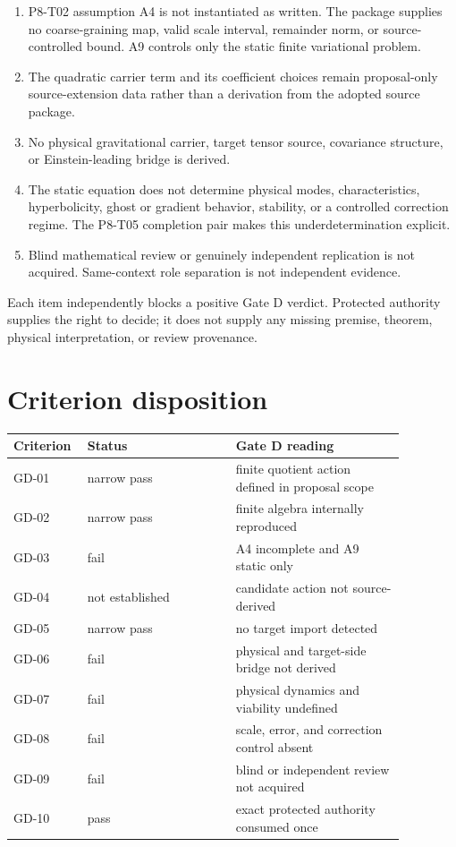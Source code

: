 \documentclass[11pt]{article}
\begin{document}
\begin{enumerate}[label=\textbf{U\arabic*.},leftmargin=*]
\item P8-T02 assumption A4 is not instantiated as written.  The package
supplies no coarse-graining map, valid scale interval, remainder norm, or
source-controlled bound.  A9 controls only the static finite variational
problem.
\item The quadratic carrier term and its coefficient choices remain
proposal-only source-extension data rather than a derivation from the adopted
source package.
\item No physical gravitational carrier, target tensor source, covariance
structure, or Einstein-leading bridge is derived.
\item The static equation does not determine physical modes,
characteristics, hyperbolicity, ghost or gradient behavior, stability, or a
controlled correction regime.  The P8-T05 completion pair makes this
underdetermination explicit.
\item Blind mathematical review or genuinely independent replication is not
acquired.  Same-context role separation is not independent evidence.
\end{enumerate}

Each item independently blocks a positive Gate D verdict.  Protected authority
supplies the right to decide; it does not supply any missing premise, theorem,
physical interpretation, or review provenance.

\section{Criterion disposition}

\begin{center}
\begin{tabular}{>{\raggedright\arraybackslash}p{0.12\linewidth}
                >{\raggedright\arraybackslash}p{0.35\linewidth}
                >{\raggedright\arraybackslash}p{0.40\linewidth}}
\toprule
Criterion & Status & Gate D reading \\
\midrule
GD-01 & narrow pass & finite quotient action defined in proposal scope \\
GD-02 & narrow pass & finite algebra internally reproduced \\
GD-03 & fail & A4 incomplete and A9 static only \\
GD-04 & not established & candidate action not source-derived \\
GD-05 & narrow pass & no target import detected \\
GD-06 & fail & physical and target-side bridge not derived \\
GD-07 & fail & physical dynamics and viability undefined \\
GD-08 & fail & scale, error, and correction control absent \\
GD-09 & fail & blind or independent review not acquired \\
GD-10 & pass & exact protected authority consumed once \\
\bottomrule
\end{tabular}
\end{center}
\end{document}
